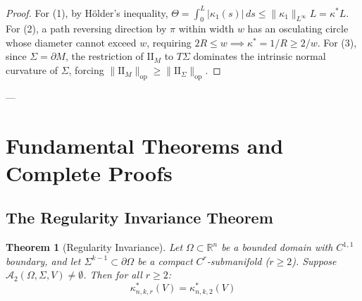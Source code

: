 \documentclass[11pt,reqno]{amsart}
\newtheorem{theorem}{Theorem}[section]
\theoremstyle{definition}
\providecommand{\R}{\mathbb{R}}
\providecommand{\II}{\mathrm{I\!I}}
\newcommand{\op}{\mathrm{op}}
\numberwithin{equation}{section}
\providecommand{\II}{\mathrm{II}}
\providecommand{\R}{\mathbb{R}}
\begin{document}
\begin{proof}
For (1), by H\"older's inequality, $\Theta = \int_0^L |\kappa_1(s)| \, ds \le \|\kappa_1\|_{L^\infty} L = \kappa^* L$. For (2), a path reversing direction by $\pi$ within width $w$ has an osculating circle whose diameter cannot exceed $w$, requiring $2R \le w \implies \kappa^* = 1/R \ge 2/w$. For (3), since $\Sigma = \partial M$, the restriction of $\II_M$ to $T\Sigma$ dominates the intrinsic normal curvature of $\Sigma$, forcing $\|\II_M\|_{\op} \ge \|\II_\Sigma\|_{\op}$.
\end{proof}

---

\section{Fundamental Theorems and Complete Proofs}

\subsection{The Regularity Invariance Theorem}

\begin{theorem}[Regularity Invariance]
\label{thm:regularity_invariance}
Let $\Omega \subset \R^n$ be a bounded domain with $C^{1,1}$ boundary, and let $\Sigma^{k-1} \subset \partial\Omega$ be a compact $C^r$-submanifold ($r \ge 2$). Suppose $\mathcal{A}_2(\Omega, \Sigma, V) \neq \emptyset$. Then for all $r \ge 2$:
\begin{equation}
\kappa^*_{n,k,r}(V) = \kappa^*_{n,k,2}(V)
\end{equation}
\end{theorem}
\end{document}
